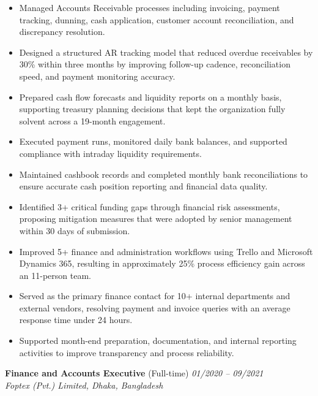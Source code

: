 \documentclass[a4paper,10pt]{article}
\begin{document}
\begin{itemize}[itemsep=0pt, topsep=0pt, leftmargin=2em]

\item Managed Accounts Receivable processes including invoicing, payment tracking, dunning, cash application, customer account reconciliation, and discrepancy resolution.

\item Designed a structured AR tracking model that reduced overdue receivables by 30\% within three months by improving follow-up cadence, reconciliation speed, and payment monitoring accuracy.

\item Prepared cash flow forecasts and liquidity reports on a monthly basis, supporting treasury planning decisions that kept the organization fully solvent across a 19-month engagement.

\item Executed payment runs, monitored daily bank balances, and supported compliance with intraday liquidity requirements.

\item Maintained cashbook records and completed monthly bank reconciliations to ensure accurate cash position reporting and financial data quality.

\item Identified 3+ critical funding gaps through financial risk assessments, proposing mitigation measures that were adopted by senior management within 30 days of submission.

\item Improved 5+ finance and administration workflows using Trello and Microsoft Dynamics 365, resulting in approximately 25\% process efficiency gain across an 11-person team.

\item Served as the primary finance contact for 10+ internal departments and external vendors, resolving payment and invoice queries with an average response time under 24 hours.

\item Supported month-end preparation, documentation, and internal reporting activities to improve transparency and process reliability.

\end{itemize}

\vspace{2pt}

\textbf{Finance and Accounts Executive} (Full-time)
\hfill \textit{01/2020 – 09/2021}\\
\textit{Foptex (Pvt.) Limited, Dhaka, Bangladesh}\\
\end{document}

